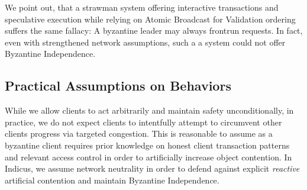 We point out, that a strawman system offering interactive transactions and speculative execution while relying on Atomic Broadcast for Validation ordering suffers the same fallacy: A byzantine leader may always frontrun requests. In fact, even with strengthened network assumptions, such a a system could not offer Byzantine Independence. \\

\iffalse
\fs{omit this next part. gracious potentially useful to talk about Fast Path. Uncivil not really}
We adapt and define gracious and uncivil executions based on cite(aardvark) to match our model. (i.e. network not sync either).
\textbf{Gracious Execution}
An execution is gracious iff (a) the execution is synchronous with some
implementation-dependent short bound on message delay (b) all clients and servers behave correctly and (c) there is no contention on the objects relevant to the execution.
\textbf{Uncivil}
An execution is uncivil iff (a) there is no bound on message delay (asynchrony) and (b) up to f servers and an arbitrary number of clients are Byzantine 
\fi

\subsection{Practical Assumptions on Behaviors}
While we allow clients to act arbitrarily and maintain safety unconditionally, in practice, we do not expect clients to intentfully attempt to circumvent other clients progress via targeted congestion. This is reasonable to assume as a byzantine client requires prior knowledge on honest client transaction patterns and relevant access control  in order to artificially increase object contention. 
In Indicus, we assume network neutrality in order to defend against explicit \textit{reactive} artificial contention and maintain Byzantine Independence.

